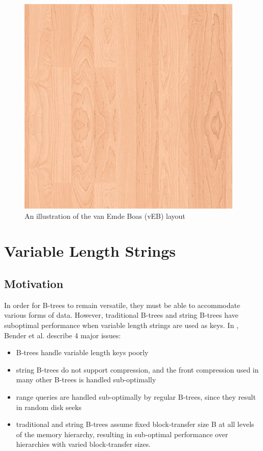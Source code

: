 \documentclass{style}
\begin{document}
\begin{figure}

\begin{center}
	\includegraphics[width=0.8\columnwidth]{figures/veb.png}
\end{center}

\caption{An illustration of the van Emde Boas (vEB) layout}
\label{fig:veb}
\end{figure}


\section{Variable Length Strings}

\subsection{Motivation}
In order for B-trees to remain versatile, they must be able to accommodate various forms of data. However, traditional B-trees and string B-trees have suboptimal performance when variable length strings are used as keys. In \cite{BenderFaKu06}, Bender et al. describe 4 major issues:
\begin{itemize}
\item B-trees handle variable length keys poorly
\item string B-trees do not support compression, and the front compression used in many other B-trees is handled sub-optimally
\item range queries are handled sub-optimally by regular B-trees, since they result in random disk seeks
\item traditional and string B-trees assume fixed block-transfer size B at all levels of the memory hierarchy, resulting in sub-optimal performance over hierarchies with varied block-transfer sizes.
\end{itemize}
\end{document}
